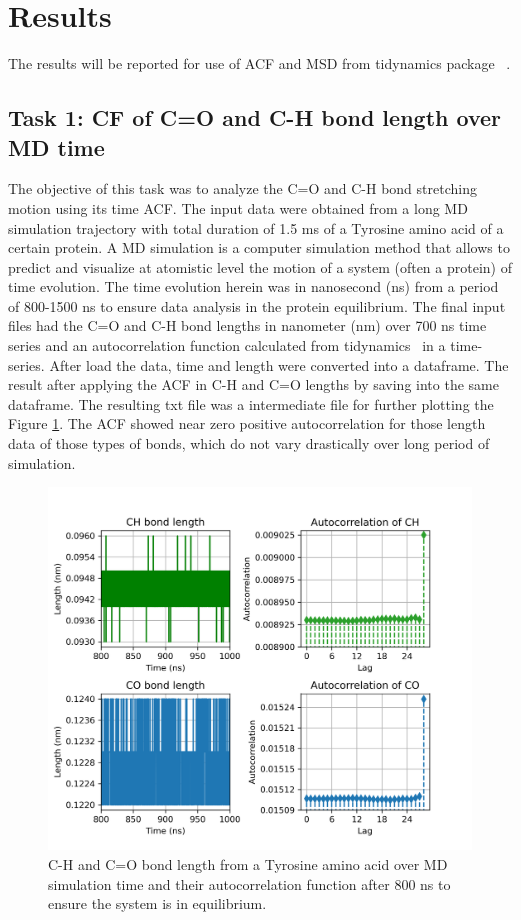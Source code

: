 \documentclass{article}
\begin{document}
\section{Results}

The results will be reported for use of ACF and MSD from tidynamics package ~\cite{Buyl2018}.

\subsection{Task 1: CF of C=O and C-H bond length over MD time}

The objective of this task was to analyze the C=O and C-H bond stretching motion using its time ACF. The input data were obtained from a long MD simulation trajectory with total duration of 1.5 ms of a Tyrosine amino acid of a certain protein. A MD simulation is a computer simulation method that allows to predict and visualize at atomistic level the motion of a system (often a protein) of time evolution. The time evolution herein was in nanosecond (ns) from a period of 800-1500 ns to ensure data analysis in the protein equilibrium. The final input files had the C=O and C-H bond lengths in nanometer (nm) over 700 ns time series and an autocorrelation function calculated from tidynamics ~\cite{Buyl2018}in a time-series. After load the data, time and length were converted into a dataframe. The result after applying the ACF in C-H and C=O lengths by saving into the same dataframe. The resulting txt file was a intermediate file for further plotting the Figure \ref{acf_plot}. The ACF showed near zero positive autocorrelation for those length data of those types of bonds, which do not vary drastically over long period of simulation.

\begin{figure}[H]
\includegraphics[width=\linewidth]{CO_CH_length_acf_plot.png}
\caption{C-H and C=O bond length from a Tyrosine amino acid over MD simulation time and their autocorrelation function after 800 ns to ensure the system is in equilibrium.}
\label{acf_plot}
\end{figure}
\end{document}
